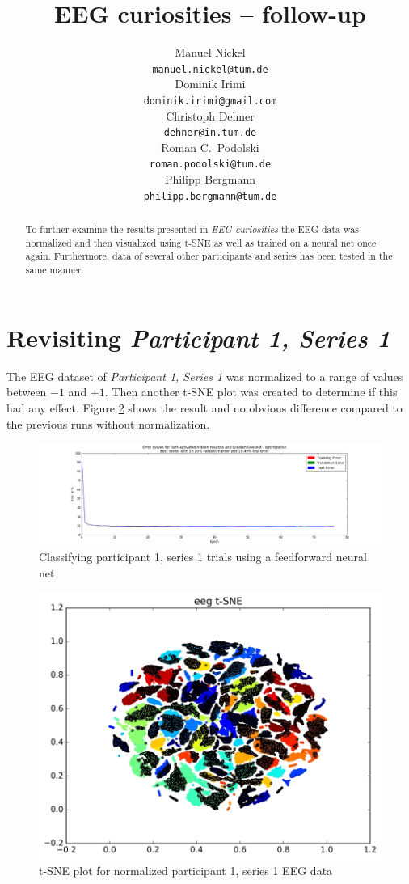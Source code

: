 \documentclass{article} %
\title{EEG curiosities -- follow-up}
\author{
Manuel Nickel
\\
\texttt{manuel.nickel@tum.de} \\
\And
Dominik Irimi \\
\texttt{dominik.irimi@gmail.com} \\
\AND
Christoph Dehner \\
\texttt{dehner@in.tum.de} \\
\And
Roman C.~Podolski \\
\texttt{roman.podolski@tum.de} \\
\And
Philipp Bergmann \\
\texttt{philipp.bergmann@tum.de} \\
}
\begin{document}
\maketitle

\begin{abstract}
To further examine the results presented in \emph{EEG curiosities} the EEG data was normalized and then visualized using t-SNE as well as trained on a neural net once again. Furthermore, data of several other participants and series has been tested in the same manner.
\end{abstract}

\section{Revisiting \emph{Participant 1, Series 1}}
The EEG dataset of \emph{Participant 1, Series 1} was normalized to a range of values between $-1$ and $+1$. Then another t-SNE plot was created to determine if this had any effect. Figure \ref{fig:eegP1S1} shows the result and no obvious difference compared to the previous runs without normalization.

\begin{figure}[h]
	\centering
	\hspace*{-1.7cm}
	\includegraphics[width=1.25\textwidth]{eegnnP1S1.png}
	\caption{Classifying participant 1, series 1 trials using a feedforward neural net}
	\label{fig:eegnnP1S1}
\end{figure}

\begin{figure}[h]
	\centering
	\includegraphics[width=1.0\textwidth]{eegP1S1.jpg}
	\caption{t-SNE plot for normalized participant 1, series 1 EEG data}
	\label{fig:eegP1S1}
\end{figure}
\end{document}
